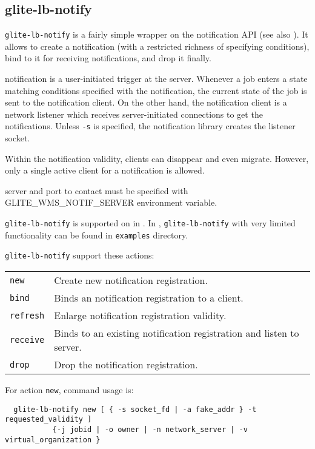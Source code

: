 \subsection{glite-lb-notify}
\label{s:lb-notify}

\verb'glite-lb-notify' is a fairly simple wrapper on the \LB notification API
(see also \cite{lbdg}).
It allows to create a notification (with a restricted richness of specifying 
conditions), bind to it for receiving notifications, and drop it finally.

\LB notification is a user-initiated trigger at the server.
Whenever a job enters a state matching conditions specified with the notification,
the current state of the job is sent to the notification client.
On the other hand, the notification client is a network listener
which receives server-initiated connections to get the notifications.
Unless \verb'-s' is specified, the notification library creates the listener
socket.

Within the notification validity, clients can disappear and even migrate.
However, only a single active client for a notification is allowed.

\LB server and port to contact must be specified with GLITE\_WMS\_NOTIF\_SERVER 
environment variable.

\verb'glite-lb-notify' is supported on in \LBnew. In \LBold, \verb'glite-lb-notify' 
with very limited functionality can be found in \verb'examples' directory.

\verb'glite-lb-notify' support these actions:

\begin{tabularx}{\textwidth}{lX}
\texttt{new} & Create new notification registration.\\
\texttt{bind} &  Binds an notification registration to a client.\\
\texttt{refresh} &  Enlarge notification registration validity.\\
\texttt{receive}  & Binds to an existing notification registration and listen to
server.\\
\texttt{drop}     & Drop the notification registration.\\
\end{tabularx}

For action \verb'new', command usage is:

\begin{verbatim}
  glite-lb-notify new [ { -s socket_fd | -a fake_addr } -t requested_validity ] 
           {-j jobid | -o owner | -n network_server | -v virtual_organization }
\end{verbatim}

